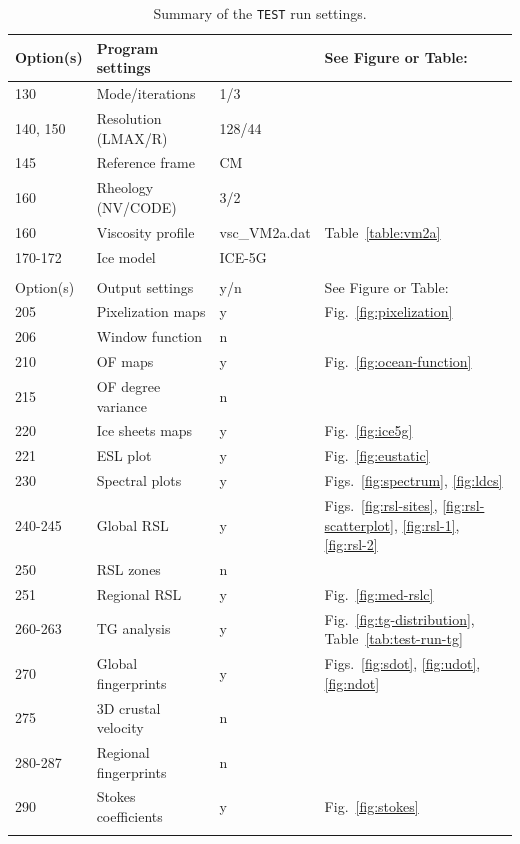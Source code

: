 \documentclass[11pt,fleqn,a4paper,titlepage]{article}
\begin{document}
\begin{table}[!hbp] 
\begin{center}
\caption[\texttt{TEST} run summary]{Summary of the \texttt{TEST} run settings.}
\begin{tabular}{llll}
\\
\hline
Option(s) & Program settings  &               & See Figure or Table:  \\
\hline
130       &Mode/iterations       &      1/3   & \\
140, 150  &Resolution (LMAX/R)   &     128/44 & \\
145       &Reference frame       &     CM & \\
160       &Rheology (NV/CODE)    &     3/2    & \\
160       &Viscosity profile     &     vsc\_VM2a.dat  & Table~\ref{table:vm2a}  \\
170-172   &Ice model             &     ICE-5G \\
\hline\\
\hline
Option(s) & Output settings    &     y/n    & See Figure or Table: \\
\hline
205   &Pixelization maps    &        y  &         Fig.~\ref{fig:pixelization} \\
206   &Window function      &        n  &                  \\ 
210   &OF maps              &        y  &         Fig.~\ref{fig:ocean-function}   \\
215   &OF degree variance   &        n  &            \\
220   &Ice sheets maps      &        y  &         Fig.~\ref{fig:ice5g} \\ 
221   &ESL plot             &        y  &         Fig.~\ref{fig:eustatic}\\
230   &Spectral plots       &        y  &         Figs.~\ref{fig:spectrum}, \ref{fig:ldcs}\\
240-245   &Global RSL      &        y  &         Figs.~\ref{fig:rsl-sites}, \ref{fig:rsl-scatterplot}, \ref{fig:rsl-1}, \ref{fig:rsl-2}\\
250       &RSL zones            &        n  &         \\
251       &Regional RSL         &        y  &         Fig.~\ref{fig:med-rslc} \\
260-263   &TG analysis          &        y  &         Fig.~\ref{fig:tg-distribution}, Table~\ref{tab:test-run-tg} \\
270       &Global fingerprints  &        y  &         Figs.~\ref{fig:sdot}, \ref{fig:udot}, \ref{fig:ndot} \\
275       &3D crustal velocity    &      n  &         \\
280-287   &Regional fingerprints  &      n  &         \\
290       &Stokes coefficients    &      y  &         Fig.~\ref{fig:stokes}\\
\hline
\label{table:test-run-summary}
\end{tabular}
\end{center}
\end{table}
\end{document}
